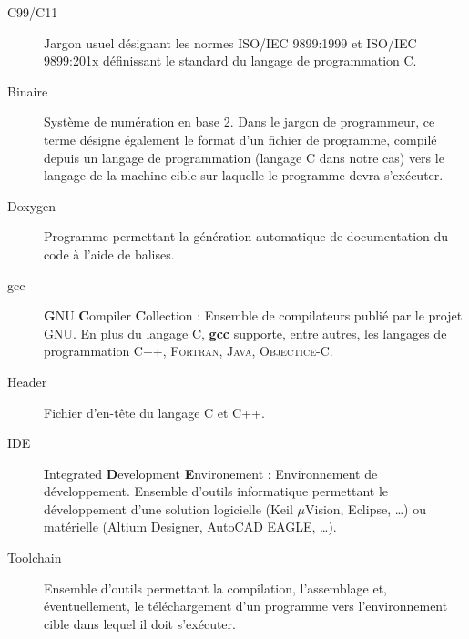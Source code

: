 \begin{description}
\item[C99/C11] Jargon usuel désignant les normes ISO/IEC 9899:1999 et ISO/IEC 9899:201x définissant le standard du langage de programmation C.
\item[Binaire] Système de numération en base 2.\linebreak
Dans le jargon de programmeur, ce terme désigne également le format d'un fichier de programme, compilé depuis un langage de programmation (langage C dans notre cas) vers le langage de la machine cible sur laquelle le programme devra s'exécuter.
\item[Doxygen] Programme permettant la génération automatique de documentation du code à l'aide de balises.
\item[gcc] \textbf{G}NU \textbf{C}ompiler \textbf{C}ollection : Ensemble de compilateurs publié par le projet GNU. En plus du langage C, \textbf{gcc} supporte, entre autres, les langages de programmation C++, \textsc{Fortran}, \textsc{Java}, \textsc{Objectice-C}.
\item[Header] Fichier d’en-tête du langage C et C++.
\item[IDE] \textbf{I}ntegrated \textbf{D}evelopment \textbf{E}nvironement : Environnement de développement.\linebreak
Ensemble d’outils informatique permettant le développement d’une solution logicielle (Keil $\mu$Vision, Eclipse, …) ou matérielle (Altium Designer, AutoCAD EAGLE, …).
\item[Toolchain] Ensemble d'outils permettant la compilation, l'assemblage et, éventuellement, le téléchargement d'un programme vers l'environnement cible dans lequel il doit s'exécuter.
\end{description}
\pagebreak
